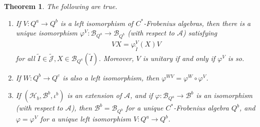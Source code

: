 \documentclass[12pt,a4paper,notitlepage]{article}
\theoremstyle{definition}
\theoremstyle{plain}
\newtheorem{thm}[df]{Theorem}
\newcommand{\mc}{\mathcal}
\newcommand{\wtd}{\widetilde}
\newcommand{\Jtd}{\widetilde{\mathcal J}}
\numberwithin{equation}{section}
\begin{document}
\begin{thm}\label{lb13}
The following are true.
\begin{enumerate}[label=(\alph*)]
\item If $V:Q^a\rightarrow Q^b$ is a left isomorphism of $C^*$-Frobenius algebras, then there is a unique isomorphism $\varphi^V:\mc B_{Q^a}\rightarrow\mc B_{Q^b}$ (with respect to $\mc A$) satisfying
\begin{align}
VX=\varphi_{\wtd I}^V(X)V	\label{eq19}
\end{align}
for all $\wtd I\in\Jtd,X\in\mc B_{Q^a}(\wtd I)$. Moreover, $V$ is unitary if and only if $\varphi^V$ is so. 
\item If $W:Q^b\rightarrow Q^c$ is also a left isomorphism, then $\varphi^{WV}=\varphi^W\circ\varphi^V$.
\item If $(\mc H_b,\mc B^b,\iota^b)$ is an extension of $\mc A$, and if $\varphi:\mc B_{Q^a}\rightarrow\mc B^b$ is an isomorphism (with respect to $\mc A$), then $\mc B^b=\mc B_{Q^b}$ for a unique $C^*$-Frobenius algebra $Q^b$, and $\varphi=\varphi^V$ for a unique left isomorphism $V:Q^a\rightarrow Q^b$.
\end{enumerate}
\end{thm}
\end{document}

